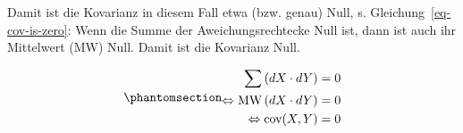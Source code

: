 \documentclass[
  letterpaper,
  twoside,
  open=any]{scrbook}
\theoremstyle{definition}
\theoremstyle{definition}
\theoremstyle{definition}
\theoremstyle{remark}
\begin{document}
Damit ist die Kovarianz in diesem Fall etwa (bzw. genau) Null, s.
Gleichung~\ref{eq-cov-is-zero}: Wenn die Summe der Aweichungsrechtecke
Null ist, dann ist auch ihr Mittelwert (MW) Null. Damit ist die
Kovarianz Null.

\begin{equation}\phantomsection\label{eq-cov-is-zero}{\begin{aligned}
\sum \left(dX \cdot dY \right) &= 0\\
\Leftrightarrow \text{MW} \left(dX \cdot dY \right) &= 0\\
\Leftrightarrow \text{cov}(X, Y) &= 0
\end{aligned}}\end{equation}

\begin{figure}

\begin{minipage}{0.45\linewidth}



\end{minipage}%
%
\begin{minipage}{0.10\linewidth}
~\end{minipage}%
%
\begin{minipage}{0.45\linewidth}

\end{minipage}
\end{figure}
\end{document}
